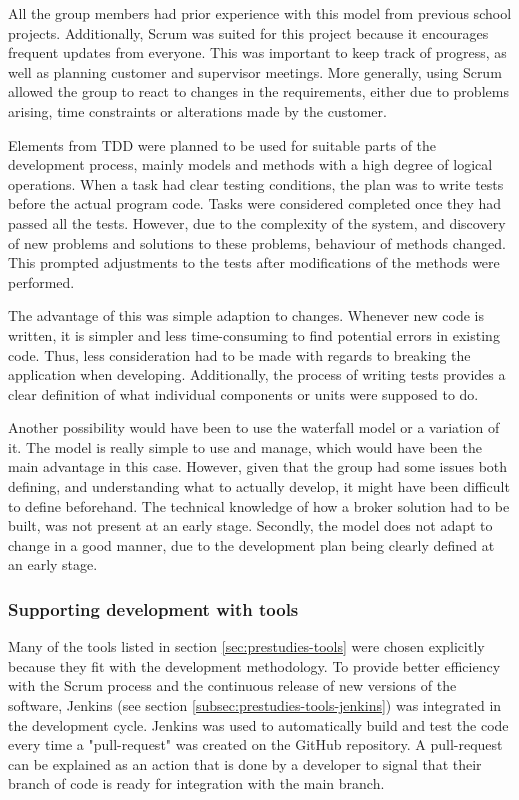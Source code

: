 All the group members had prior experience with this model from previous school projects. Additionally, Scrum was suited for this project because it encourages frequent updates from everyone. This was important to keep track of progress, as well as planning customer and supervisor meetings. More generally, using Scrum allowed the group to react to changes in the requirements, either due to problems arising, time constraints or alterations made by the customer. 

Elements from TDD were planned to be used for suitable parts of the development process, mainly models and methods with a high degree of logical operations. When a task had clear testing conditions, the plan was to write tests before the actual program code. Tasks were considered completed once they had passed all the tests. However, due to the complexity of the system, and discovery of new problems and solutions to these problems, behaviour of methods changed. This prompted adjustments to the tests after modifications of the methods were performed.

The advantage of this was simple adaption to changes. Whenever new code is written, it is simpler and less time-consuming to find potential errors in existing code. Thus, less consideration had to be made with regards to breaking the application when developing. Additionally, the process of writing tests provides a clear definition of what individual components or units were supposed to do.

Another possibility would have been to use the waterfall model or a variation of it. The model is really simple to use and manage, which would have been the main advantage in this case. However, given that the group had some issues both defining, and understanding what to actually develop, it might have been difficult to define beforehand. The technical knowledge of how a broker solution had to be built, was not present at an early stage. Secondly, the model does not adapt to change in a good manner, due to the development plan being clearly defined at an early stage. 

\subsubsection{Supporting development with tools}
Many of the tools listed in section \ref{sec:prestudies-tools} were chosen explicitly because they fit with the development methodology. To provide better efficiency with the Scrum process and the continuous release of new versions of the software, Jenkins (see section \ref{subsec:prestudies-tools-jenkins}) was integrated in the development cycle. Jenkins was used to automatically build and test the code every time a "pull-request" was created on the GitHub repository. A pull-request can be explained as an action that is done by a developer to signal that their branch of code is ready for integration with the main branch. 

